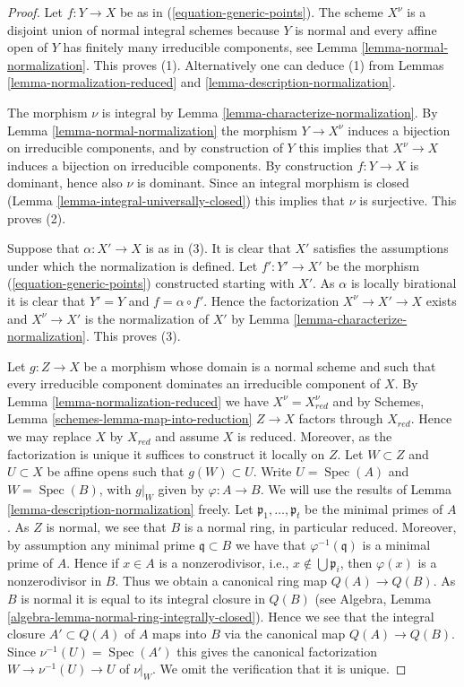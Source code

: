\documentclass[10pt,a4paper]{amsart}
\theoremstyle{plain}
\theoremstyle{definition}
\theoremstyle{remark}
\numberwithin{equation}{subsection}
\def\Spec{\mathop{\mathrm{Spec}}}
\begin{document}
\begin{proof}
Let $f : Y \to X$ be as in (\ref{equation-generic-points}).
The scheme $X^\nu$ is a disjoint union of normal integral schemes
because $Y$ is normal and every affine open of $Y$ has finitely
many irreducible components, see
Lemma \ref{lemma-normal-normalization}. This proves (1).
Alternatively one can deduce (1) from
Lemmas \ref{lemma-normalization-reduced} and
\ref{lemma-description-normalization}.

\medskip\noindent
The morphism $\nu$ is integral by Lemma \ref{lemma-characterize-normalization}.
By Lemma \ref{lemma-normal-normalization} the
morphism $Y \to X^\nu$ induces a bijection on irreducible components,
and by construction of $Y$ this implies that $X^\nu \to X$ induces
a bijection on irreducible components. By construction $f : Y \to X$
is dominant, hence also $\nu$ is dominant. Since an integral morphism is
closed (Lemma \ref{lemma-integral-universally-closed}) this implies that
$\nu$ is surjective. This proves (2).

\medskip\noindent
Suppose that $\alpha : X' \to X$ is as in (3). It is clear that
$X'$ satisfies the assumptions under which the normalization
is defined. Let $f' : Y' \to X'$ be the morphism
(\ref{equation-generic-points}) constructed starting with $X'$.
As $\alpha$ is locally birational it is clear that
$Y' = Y$ and $f = \alpha \circ f'$.
Hence the factorization $X^\nu \to X' \to X$ exists
and $X^\nu \to X'$ is the normalization of $X'$ by
Lemma \ref{lemma-characterize-normalization}. This proves (3).

\medskip\noindent
Let $g : Z \to X$ be a morphism whose domain is a normal scheme
and such that every irreducible component dominates an irreducible
component of $X$. By Lemma \ref{lemma-normalization-reduced}
we have $X^\nu = X_{red}^\nu$ and by
Schemes, Lemma \ref{schemes-lemma-map-into-reduction}
$Z \to X$ factors through $X_{red}$. Hence we may replace $X$ by
$X_{red}$ and assume $X$ is reduced. Moreover, as the factorization
is unique it suffices to construct it locally on $Z$.
Let $W \subset Z$ and $U \subset X$ be affine opens
such that $g(W) \subset U$. Write $U = \Spec(A)$ and
$W = \Spec(B)$, with $g|_W$ given by $\varphi : A \to B$.
We will use the results of Lemma \ref{lemma-description-normalization} freely.
Let $\mathfrak p_1, \ldots, \mathfrak p_t$ be the minimal primes of $A$.
As $Z$ is normal, we see that $B$ is a normal
ring, in particular reduced. Moreover, by assumption any minimal
prime $\mathfrak q \subset B$ we have that $\varphi^{-1}(\mathfrak q)$
is a minimal prime of $A$. Hence if $x \in A$ is a nonzerodivisor, i.e.,
$x \not \in \bigcup \mathfrak p_i$, then $\varphi(x)$ is a nonzerodivisor
in $B$. Thus we obtain a canonical ring map $Q(A) \to Q(B)$. As $B$ is
normal it is equal to its integral closure in $Q(B)$ (see
Algebra, Lemma \ref{algebra-lemma-normal-ring-integrally-closed}).
Hence we see that the integral closure $A' \subset Q(A)$ of $A$
maps into $B$ via the canonical map $Q(A) \to Q(B)$.
Since $\nu^{-1}(U) = \Spec(A')$ this gives the canonical
factorization $W \to \nu^{-1}(U) \to U$ of $\nu|_W$.
We omit the verification that it is unique.
\end{proof}
\end{document}
